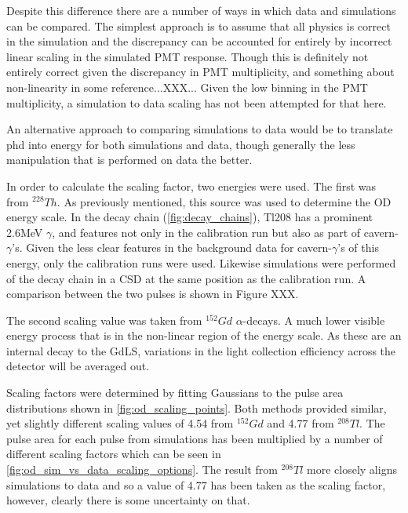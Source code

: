 \par
Despite this difference there are a number of ways in which data and simulations can be compared.
The simplest approach is to assume that all physics is correct in the simulation and the discrepancy can be accounted for entirely by incorrect linear scaling in the simulated PMT response.
Though this is definitely not entirely correct given the discrepancy in PMT multiplicity, and something about non-linearity in some reference...XXX...
Given the low binning in the PMT multiplicity, a simulation to data scaling has not been attempted for that here.
\par
An alternative approach to comparing simulations to data would be to translate phd into energy for both simulations and data, though generally the less manipulation that is performed on data the better.

\par
In order to calculate the scaling factor, two energies were used.
The first was from ${}^{228}Th$.
As previously mentioned, this source was used to determine the OD energy scale.
In the decay chain (\autoref{fig:decay_chains}), Tl208 has a prominent 2.6MeV $\gamma$, and features not only in the calibration run but also as part of cavern-$\gamma$'s.
Given the less clear features in the background data for cavern-$\gamma$'s of this energy, only the calibration runs were used.
Likewise simulations were performed of the decay chain in a CSD at the same position as the calibration run.
A comparison between the two pulses is shown in Figure XXX.
\par
The second scaling value was taken from ${}^{152}Gd$ $\alpha$-decays.
A much lower visible energy process that is in the non-linear region of the energy scale.
As these are an internal decay to the GdLS, variations in the light collection efficiency across the detector will be averaged out.
\par
Scaling factors were determined by fitting Gaussians to the pulse area distributions shown in \autoref{fig:od_scaling_points}.
Both methods provided similar, yet slightly different scaling values of 4.54 from ${}^{152}Gd$ and 4.77 from ${}^{208}Tl$.
The pulse area for each pulse from simulations has been multiplied by a number of different scaling factors which can be seen in \autoref{fig:od_sim_vs_data_scaling_options}.
The result from ${}^{208}Tl$ more closely aligns simulations to data and so a value of 4.77 has been taken as the scaling factor, however, clearly there is some uncertainty on that.






